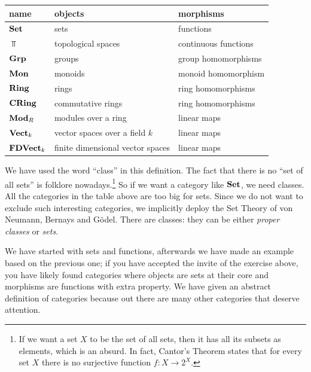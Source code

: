 \begin{center}
  \begin{tabular}{l|ll}
    name & objects & morphisms \\
    \midrule
    \(\mathbf{Set}\) & sets & functions \\
    \(\Top\) & topological spaces & continuous functions \\
    \(\mathbf{Grp}\) & groups & group homomorphisms \\
    \(\mathbf{Mon}\) & monoids & monoid homomorphism \\
    \(\mathbf{Ring}\) & rings & ring homomorphisms \\
    \(\mathbf{CRing}\) & commutative rings & ring homomorphisms
    \\
    \(\mathbf{Mod}_R\) & modules over a ring & linear maps \\
    \(\mathbf{Vect}_k\) & vector spaces over a field \(k\) & linear maps \\
    \(\mathbf{FDVect}_k\) & finite dimensional vector spaces & linear maps \\
  \end{tabular}
  
\end{center}

\begin{remark}
  We have used the word ``class'' in this definition. The fact that
  there is no ``set of all sets'' is folklore nowadays.\footnote{If we
    want a set \(X\) to be the set of all sets, then it has all its
    subsets as elements, which is an absurd. In fact, Cantor's Theorem
    states that for every set \(X\) there is no surjective function
    \(f : X \to 2^X\).}  So if we want a category like \(\mathbf{Set}\), we need
  classes. All the categories in the table above are too big for
  sets. Since we do not want to exclude such interesting categories, we
  implicitly deploy the Set Theory of von Neumann, Bernays and
  G\"odel. There are classes: they can be either {\em proper classes} or
  {\em sets}.
\end{remark}

We have started with sets and functions, afterwards we have made an
example based on the previous one; if you have accepted the invite of
the exercise above, you have likely found categories where objects are
sets at their core and morphisms are functions with extra property. We
have given an abstract definition of categories because out there are
many other categories that deserve attention.

